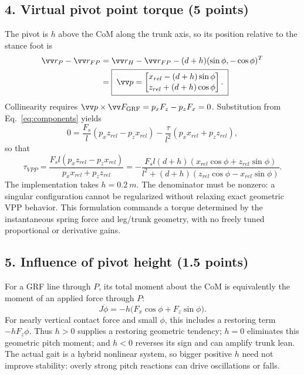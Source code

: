 \subsection*{4. Virtual pivot point torque (5 points)}
The pivot is $h$ above the CoM along the trunk axis, so its position relative to the stance foot is
\begin{align}
\vv r_P-\vv r_{FP}
&=\vv r_H-\vv r_{FP}-(d+h)(\sin\phi,-\cos\phi)^T\\
&=\boxed{\;\vv p=\begin{bmatrix}x_{rel}-(d+h)\sin\phi\\[0.1em] z_{rel}+(d+h)\cos\phi\end{bmatrix}.\;}
\label{eq:p}
\end{align}
Collinearity requires $\vv p\times\vv F_{\mathrm{GRF}}=p_xF_z-p_zF_x=0$. Substitution from Eq.~\eqref{eq:components} yields
\begin{equation}
0=\frac{F_s}{l}(p_x z_{rel}-p_z x_{rel})
 -\frac{\tau}{l^2}(p_x x_{rel}+p_z z_{rel}),
\end{equation}
so that
\begin{equation}
\boxed{\;\tau_{VPP}=
\frac{F_s l (p_xz_{rel}-p_zx_{rel})}{p_xx_{rel}+p_zz_{rel}}
=-\frac{F_s l(d+h)(x_{rel}\cos\phi+z_{rel}\sin\phi)}
 {l^2+(d+h)(z_{rel}\cos\phi-x_{rel}\sin\phi)}.\;}
\label{eq:VPP}
\end{equation}
The implementation takes $h=\SI{0.2}{m}$. The denominator must be nonzero: a singular configuration cannot be regularized without relaxing exact geometric VPP behavior. This formulation commands a torque determined by the instantaneous spring force and leg/trunk geometry, with no freely tuned proportional or derivative gains.

\subsection*{5. Influence of pivot height (1.5 points)}
For a GRF line through $P$, its total moment about the CoM is equivalently the moment of an applied force through $P$:
\begin{equation}
J\ddot\phi=-h\bigl(F_x\cos\phi+F_z\sin\phi\bigr).
\label{eq:pivotmoment}
\end{equation}
For nearly vertical contact force and small $\phi$, this includes a restoring term $-hF_z\phi$. Thus $h>0$ supplies a restoring geometric tendency; $h=0$ eliminates this geometric pitch moment; and $h<0$ reverses its sign and can amplify trunk lean. The actual gait is a hybrid nonlinear system, so bigger positive $h$ need not improve stability: overly strong pitch reactions can drive oscillations or falls.

